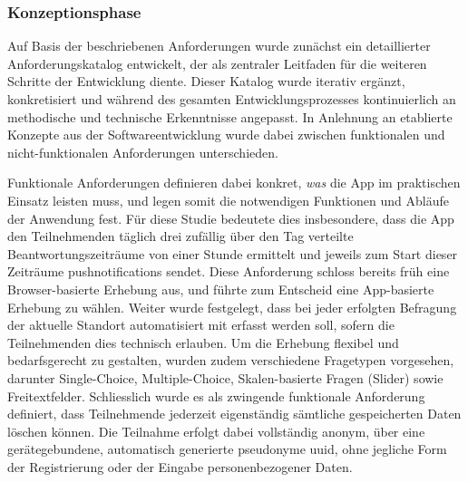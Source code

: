 \subsubsection{Konzeptionsphase}
Auf Basis der beschriebenen Anforderungen wurde zunächst ein detaillierter Anforderungskatalog entwickelt, der als zentraler Leitfaden für die weiteren Schritte der Entwicklung diente. Dieser Katalog wurde iterativ ergänzt, konkretisiert und während des gesamten Entwicklungsprozesses kontinuierlich an methodische und technische Erkenntnisse angepasst. In Anlehnung an etablierte Konzepte aus der Softwareentwicklung wurde dabei zwischen funktionalen und nicht-funktionalen Anforderungen unterschieden.

Funktionale Anforderungen definieren dabei konkret, \textit{was} die App im praktischen Einsatz leisten muss, und legen somit die notwendigen Funktionen und Abläufe der Anwendung fest. Für diese Studie bedeutete dies insbesondere, dass die App den Teilnehmenden täglich drei zufällig über den Tag verteilte Beantwortungszeiträume von einer Stunde ermittelt und jeweils zum Start dieser Zeiträume \glspl{pushnotification} sendet. Diese Anforderung schloss bereits früh eine Browser-basierte Erhebung aus, und führte zum Entscheid eine App-basierte Erhebung zu wählen. Weiter wurde festgelegt, dass bei jeder erfolgten Befragung der aktuelle Standort automatisiert mit erfasst werden soll, sofern die Teilnehmenden dies technisch erlauben. Um die Erhebung flexibel und bedarfsgerecht zu gestalten, wurden zudem verschiedene Fragetypen vorgesehen, darunter Single-Choice, Multiple-Choice, Skalen-basierte Fragen (Slider) sowie Freitextfelder. Schliesslich wurde es als zwingende funktionale Anforderung definiert, dass Teilnehmende jederzeit eigenständig sämtliche gespeicherten Daten löschen können. Die Teilnahme erfolgt dabei vollständig anonym, über eine gerätegebundene, automatisch generierte pseudonyme \gls{uuid}, ohne jegliche Form der Registrierung oder der Eingabe personenbezogener Daten.
 
